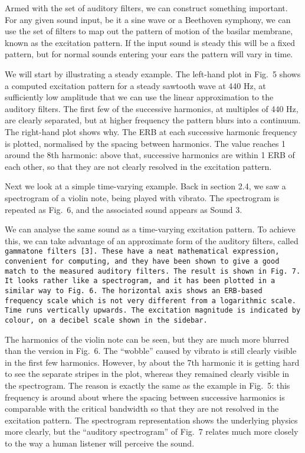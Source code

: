   Armed with the set of auditory filters, we can construct something important. 
  For any given sound input, be it a sine wave or a Beethoven symphony, we can 
  use the set of filters to map out the pattern of motion of the basilar 
  membrane, known as the excitation pattern. If the input sound is steady this 
  will be a fixed pattern, but for normal sounds entering your ears the pattern 
  will vary in time. 

  We will start by illustrating a steady example. The left-hand plot in Fig.\ 5 
  shows a computed excitation pattern for a steady sawtooth wave at 440 Hz, at 
  sufficiently low amplitude that we can use the linear approximation to the 
  auditory filters. The first few of the successive harmonics, at multiples of 
  440 Hz, are clearly separated, but at higher frequency the pattern blurs into 
  a continuum. The right-hand plot shows why. The ERB at each successive 
  harmonic frequency is plotted, normalised by the spacing between harmonics. 
  The value reaches 1 around the 8th harmonic: above that, successive harmonics 
  are within 1 ERB of each other, so that they are not clearly resolved in the 
  excitation pattern. 

  Next we look at a simple time-varying example. Back in section 2.4, we saw a 
  spectrogram of a violin note, being played with vibrato. The spectrogram is 
  repeated as Fig.\ 6, and the associated sound appears as Sound 3. 

  We can analyse the same sound as a time-varying excitation pattern. To 
  achieve this, we can take advantage of an approximate form of the auditory 
  filters, called \tt{}gammatone filters\rm{} [3]. These have a neat 
  mathematical expression, convenient for computing, and they have been shown 
  to give a good match to the measured auditory filters. The result is shown in 
  Fig.\ 7. It looks rather like a spectrogram, and it has been plotted in a 
  similar way to Fig.\ 6. The horizontal axis shows an ERB-based frequency 
  scale which is not very different from a logarithmic scale. Time runs 
  vertically upwards. The excitation magnitude is indicated by colour, on a 
  decibel scale shown in the sidebar. 

  The harmonics of the violin note can be seen, but they are much more blurred 
  than the version in Fig.\ 6. The ``wobble'' caused by vibrato is still 
  clearly visible in the first few harmonics. However, by about the 7th 
  harmonic it is getting hard to see the separate stripes in the plot, whereas 
  they remained clearly visible in the spectrogram. The reason is exactly the 
  same as the example in Fig.\ 5: this frequency is around about where the 
  spacing between successive harmonics is comparable with the critical 
  bandwidth so that they are not resolved in the excitation pattern. The 
  spectrogram representation shows the underlying physics more clearly, but the 
  ``auditory spectrogram'' of Fig.\ 7 relates much more closely to the way a 
  human listener will perceive the sound. 

